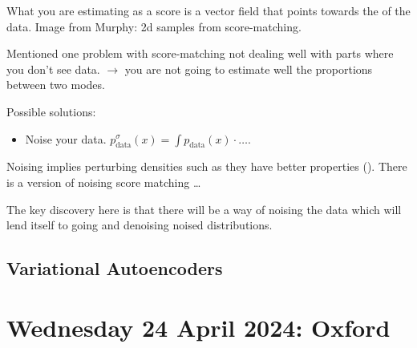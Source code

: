 \documentclass{article}
\begin{document}
    What you are estimating as a score is a vector field that points towards the  of the data. Image from Murphy: 2d samples from score-matching. 

    Mentioned one problem with score-matching not dealing well with parts where you don't see data. $\rightarrow$ you are not going to estimate well the proportions between two modes.

    Possible solutions:
    \begin{itemize}
        \item Noise your data. $p^\sigma_\text{data}(x) = \int p_\text{data}(x) \cdot \dots$.
    \end{itemize}

    Noising implies perturbing densities such as they have better properties ().
    There is a version of noising score matching \ldots

    The key discovery here is that there will be a way of noising the data which will lend itself to going  and denoising noised distributions.

    \subsection{Variational Autoencoders}

  \newpage

  \section{Wednesday 24 April 2024: Oxford}
\end{document}
